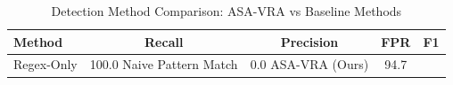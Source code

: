 \begin{table}[htbp]
  \centering
  \caption{Detection Method Comparison: ASA-VRA vs Baseline Methods}
  \label{tab:method-comparison}
  \begin{tabular}{lcccc}
    \toprule
    \textbf{Method} & \textbf{Recall} & \textbf{Precision} & \textbf{FPR} & \textbf{F1} \\
    \midrule
    Regex-Only & 100.0%
    Naive Pattern Match & 0.0%
    ASA-VRA (Ours) & 94.7%
    \bottomrule
  \end{tabular}
\end{table}